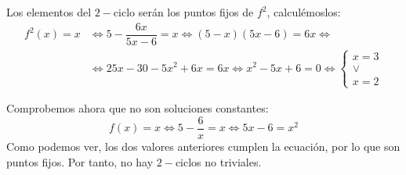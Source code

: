\begin{ejercicio}
\begin{enumerate}
        Los elementos del $2-$ciclo serán los puntos fijos de $f^2$, calculémoslos:
        \begin{align*}
            f^2(x)=x &\Longleftrightarrow 5-\dfrac{6x}{5x-6} = x \Longleftrightarrow
            (5-x)(5x-6) = 6x \Longleftrightarrow \\ &\Longleftrightarrow
            25x-30-5x^2+6x=6x \Longleftrightarrow
            x^2-5x+6 = 0 \Longleftrightarrow
            \left\{
            \begin{array}{c}
                x = 3\\
                \lor \\
                x=2
            \end{array}\right.
        \end{align*}

        Comprobemos ahora que no son soluciones constantes:
        \begin{equation*}
            f(x)=x \Longleftrightarrow
            5-\frac{6}{x} = x \Longleftrightarrow 5x-6=x^2
        \end{equation*}
        Como podemos ver, los dos valores anteriores cumplen la ecuación, por lo que son puntos fijos. Por tanto, no hay $2-$ciclos no triviales.
    \end{enumerate}
\end{ejercicio}


